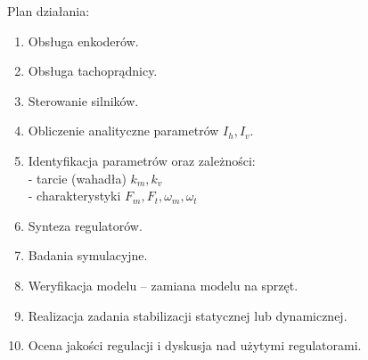 Plan działania: \\

\begin{enumerate}
\item Obsługa enkoderów.
\item Obsługa tachoprądnicy.
\item Sterowanie silników.
\item Obliczenie analityczne parametrów $I_h, I_v$.
\item Identyfikacja parametrów oraz zależności: \\
- tarcie (wahadła) $k_m, k_v$ \\
- charakterystyki $F_m, F_t, \omega_m, \omega_t$ 
\item Synteza regulatorów.
\item Badania symulacyjne.
\item Weryfikacja modelu – zamiana modelu na sprzęt.
\item Realizacja zadania stabilizacji statycznej lub dynamicznej.
\item Ocena jakości regulacji i dyskusja nad użytymi regulatorami.
\end{enumerate}
